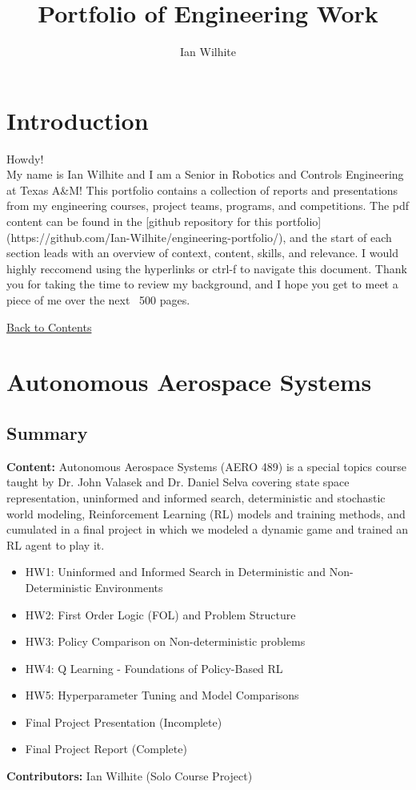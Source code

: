 \documentclass[a4paper,12pt]{article}
\title{Portfolio of Engineering Work}
\author{Ian Wilhite}
\begin{document}
\sloppy


\section*{Introduction}
Howdy! \\
My name is Ian Wilhite and I am a Senior in Robotics and Controls Engineering at Texas A\&M! This portfolio contains a collection of reports and presentations from my engineering courses, project teams, programs, and competitions. The pdf content can be found in the [github repository for this portfolio](https://github.com/Ian-Wilhite/engineering-portfolio/), and the start of each section leads with an overview of context, content, skills, and relevance. I would highly reccomend using the hyperlinks or ctrl-f to navigate this document. 
Thank you for taking the time to review my background, and I hope you get to meet a piece of me over the next ~500 pages.

{}
\label{toc}
\tableofcontents
\newpage

\hyperlink{toc}{Back to Contents}
\section{Autonomous Aerospace Systems}
\subsection*{Summary}
\textbf{Content:} Autonomous Aerospace Systems (AERO 489) is a special topics course taught by Dr. John Valasek and Dr. Daniel Selva covering state space representation, uninformed and informed search, deterministic and stochastic world modeling, Reinforcement Learning (RL) models and training methods, and cumulated in a final project in which we modeled a dynamic game and trained an RL agent to play it. 
\begin{itemize}
    \item HW1: Uninformed and Informed Search in Deterministic and Non-Deterministic Environments 
    \item HW2: First Order Logic (FOL) and Problem Structure
    \item HW3: Policy Comparison on Non-deterministic problems
    \item HW4: Q Learning - Foundations of Policy-Based RL
    \item HW5: Hyperparameter Tuning and Model Comparisons  
    \item Final Project Presentation (Incomplete)
    \item Final Project Report (Complete)
\end{itemize}
\textbf{Contributors:} Ian Wilhite (Solo Course Project)
\end{document}
